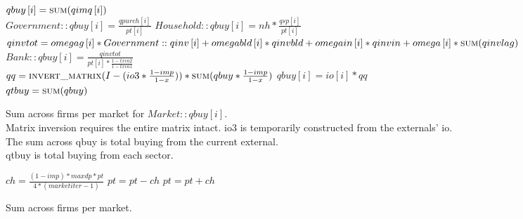 \documentclass{article}
\begin{document}
\begin{algorithm}[H]
\caption{Compute Buying}
    \begin{algorithmic}
        \State \(qbuy\left[i\right] = \Call{sum}{qimq\left[i\right]}\)
        \EndFor
        \EndFor
        \\
        \State \(Government::qbuy\left[i\right] = \frac{qpurch\left[i\right]}{pt\left[i\right]}\)
        \State \(Household::qbuy\left[i\right] = nh * \frac{qsp\left[i\right]}{pt\left[i\right]}\)
        \\
        \State \(qinvtot = omegag\left[i\right] * Government::qinv\left[i\right] + omegabld\left[i\right] * qinvbld + omegain\left[i\right] * qinvin + omega\left[i\right] * \Call{sum}{qinvlag}\)
        \State \(Bank::qbuy\left[i\right] = \frac{qinvtot}{pt\left[i\right] * \frac{1 - txva2}{1 - txva1}}\)
        \EndFor
        \\
        \State \(qq = \Call{invert\_matrix}{I - (io3 * \frac{1- imp}{1 - x})} * \Call{sum}{qbuy * \frac{1 - imp}{1 - x}}\)
        \State \(qbuy\left[i\right] = io\left[i\right] * qq\)
        \EndFor
        \EndFor
        \\
        \State \(qtbuy = \Call{sum}{qbuy}\)
        \EndFor
        \EndFunction
    \end{algorithmic}
    \small Sum across firms per market for \(Market::qbuy\left[i\right]\).\\
    \small Matrix inversion requires the entire matrix intact. io3 is temporarily constructed from the externals' io.\\
    \small The sum across qbuy is total buying from the current external.\\
    \small qtbuy is total buying from each sector.
\end{algorithm}

\begin{algorithm}[!htbp]
\caption{Price Adjust}
    \begin{algorithmic}
        \State \(ch = \frac{(1 - imp) * maxdp * pt}{4 * (marketiter - 1)}\)
        \State \(pt = pt - ch\)
        \Else
        \State \(pt = pt + ch\)
        \EndIf
        \EndFunction
    \end{algorithmic}
    \small Sum across firms per market.
\end{algorithm}
\end{document}
